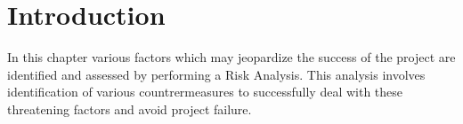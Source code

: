 \section{Introduction}
In this chapter various factors which may jeopardize the success of the project are identified and assessed by performing a Risk Analysis. This analysis involves identification of various countrermeasures to successfully deal with these threatening factors and avoid project failure.


